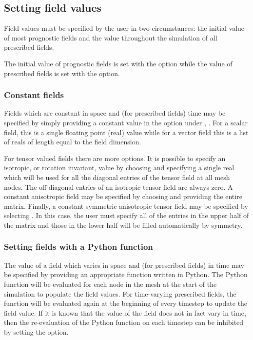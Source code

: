 \subsection{Setting field values}\label{sec:setting_field_values}
Field values must be specified by the user in two circumstances: the initial
value of most prognostic fields and the value throughout the simulation of
all prescribed fields. 

The initial value of prognostic fields is set with the
 option while the value of
prescribed fields is set with the  option.


\subsubsection{Constant fields}
Fields which are constant in space and (for prescribed fields) time may be
specified by simply providing a constant value in the 
option under ,
. For a scalar field, this is a single
floating point (real) value while for a vector field this is a list of reals
of length equal to the field dimension.

For tensor valued fields there are more options. It is possible to specify
an isotropic, or rotation invariant, value by choosing
 and specifying a single real which
will be used for all the diagonal entries of the tensor field at all mesh
nodes. The off-diagonal entries of an isotropic tensor field are always
zero. A constant anisotropic field may be specified by choosing
 and providing the
entire matrix. Finally, a constant symmetric anisotropic tensor field may be
specified by selecting \onlypdf\linebreak
{}. In this case, the
user must specify all of the entries in the upper half of the matrix and
those in the lower half will be filled automatically by symmetry.

\subsubsection{Setting fields with a Python function}\label{sec:setting_with_python}
The value of a field which varies in space and (for prescribed fields) in
time may be specified by providing an appropriate function written in
Python. The Python function will be evaluated for each node in the mesh at
the start of the simulation to populate the field values. For time-varying
prescribed fields, the function will be evaluated again at the beginning of
every timestep to update the field value. If it is known that the value of
the field does not in fact vary in time, then the re-evaluation of the
Python function on each timestep can be inhibited by setting the
\onlypdf\linebreak {} option.

